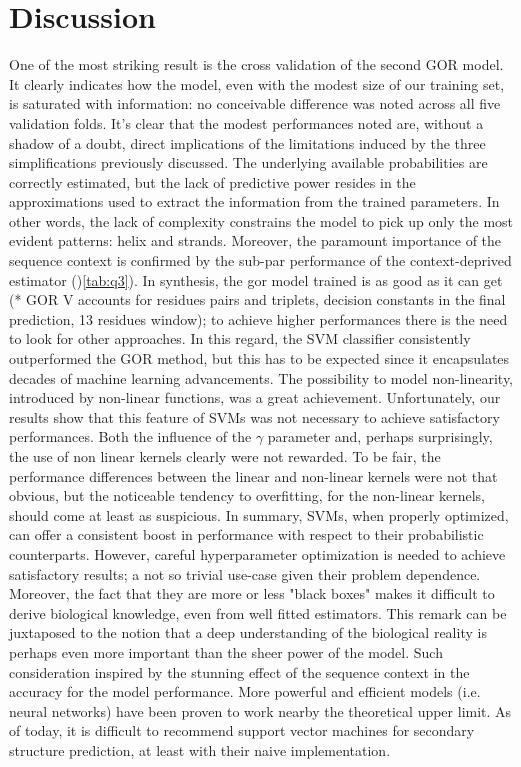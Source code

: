 \documentclass[nocrop]{bioinfo}
\begin{document}
\section{Discussion}
One of the most striking result is the cross validation of the second GOR model.
It clearly indicates how the model, even with the modest size of our training set, is saturated with information: no conceivable difference was noted across all five validation folds.
It's clear that the modest performances noted are, without a shadow of a doubt, direct implications of the  limitations induced by the three simplifications previously discussed.
The underlying available probabilities are correctly estimated, but the lack of predictive power resides in the approximations used to extract the information from the trained parameters.
In other words, the lack of complexity constrains the model to pick up only the most evident patterns: helix and strands.
Moreover, the paramount importance of the sequence context is confirmed by the sub-par performance of the context-deprived estimator ()\autoref{tab:q3}).
In synthesis, the gor model trained is as good as it can get (* GOR V accounts for residues pairs and triplets, decision constants in the final prediction, 13 residues window); to achieve higher performances there is the need to look for other approaches.
In this regard, the SVM classifier consistently outperformed the GOR method, but this has to be expected since it encapsulates decades of machine learning advancements.
The possibility to model non-linearity, introduced by non-linear functions, was a great achievement.
Unfortunately, our results show that this feature of SVMs was not necessary to achieve satisfactory performances.
Both the influence of the $\gamma$ parameter and, perhaps surprisingly, the use of non linear kernels clearly were not rewarded.
To be fair, the performance differences between the linear and non-linear kernels were not that obvious, but the noticeable tendency to overfitting, for the non-linear kernels, should come at least as suspicious.
In summary, SVMs, when properly optimized, can offer a consistent boost in performance with respect to their probabilistic counterparts.
However, careful hyperparameter optimization is needed to achieve satisfactory results; a not so trivial use-case given their problem dependence.
Moreover, the fact that they are more or less "black boxes" makes it difficult to derive biological knowledge, even from well fitted estimators.
This remark can be juxtaposed to the notion that a deep understanding of the biological reality is perhaps even more important than the sheer power of the model.
Such consideration inspired by the stunning effect of the sequence context in the accuracy for the model performance.
More powerful and efficient models (i.e. neural networks) have been proven to work nearby the theoretical upper limit.
As of today, it is difficult to recommend  support vector machines for secondary structure prediction, at least with their naive implementation.
\end{document}

